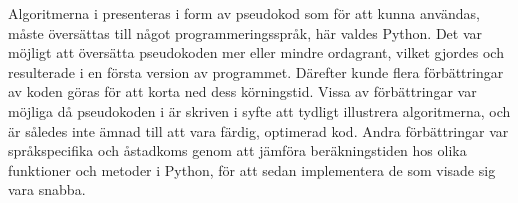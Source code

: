 

Algoritmerna i \cite{HaraldSieve} presenteras i form av pseudokod som för att kunna användas, måste översättas till något programmeringsspråk, här valdes Python.
Det var möjligt att översätta pseudokoden mer eller mindre ordagrant, vilket gjordes och resulterade i en första version av programmet.
Därefter kunde flera förbättringar av koden göras för att korta ned dess körningstid. 
Vissa av förbättringar var möjliga då pseudokoden i \cite{HaraldSieve} är skriven i syfte att tydligt illustrera algoritmerna,
och är således inte ämnad till att vara färdig, optimerad kod.
Andra förbättringar var språkspecifika och åstadkoms genom att jämföra beräkningstiden hos olika funktioner och metoder i Python, för att sedan implementera de som visade sig vara snabba.



